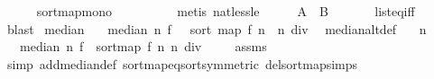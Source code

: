 \begin{isabellebody}
\ \ \ \ \isamarkupfalse%
\ sort{\isacharunderscore}{\kern0pt}map{\isacharunderscore}{\kern0pt}mono\ \ \ \ \isanewline
\ \ \ \ \isamarkupfalse%
\ {\isacharparenleft}{\kern0pt}metis\ nat{\isacharunderscore}{\kern0pt}less{\isacharunderscore}{\kern0pt}le{\isacharparenright}{\kern0pt}\isanewline
\ \ \isamarkupfalse%
\ \isamarkupfalse%
\ {\isachardoublequoteopen}{\isacharquery}{\kern0pt}A\ {\isacharequal}{\kern0pt}\ {\isacharquery}{\kern0pt}B{\isachardoublequoteclose}\ \isanewline
\ \ \ \ \isamarkupfalse%
\ list{\isacharunderscore}{\kern0pt}eq{\isacharunderscore}{\kern0pt}iff\ \isamarkupfalse%
\ blast\isanewline
{}\isamarkupfalse%
%
\endisatagproof
{\isafoldproof}%
%
\isadelimproof
\isanewline
%
\endisadelimproof
\isanewline
{}\isamarkupfalse%
\ median\ \isanewline
\ \ {\isachardoublequoteopen}median\ n\ f\ {\isacharequal}{\kern0pt}\ \ sort\ {\isacharparenleft}{\kern0pt}map\ f\ {\isacharbrackleft}{\kern0pt}{}{\isachardot}{\kern0pt}{\isachardot}{\kern0pt}{\isacharless}{\kern0pt}n{\isacharbrackright}{\kern0pt}{\isacharparenright}{\kern0pt}\ {\isacharbang}{\kern0pt}\ {\isacharparenleft}{\kern0pt}n\ div\ {}{\isacharparenright}{\kern0pt}{\isachardoublequoteclose}\isanewline
\isanewline
{}\isamarkupfalse%
\ median{\isacharunderscore}{\kern0pt}alt{\isacharunderscore}{\kern0pt}def{\isacharcolon}{\kern0pt}\isanewline
\ \ \ {\isachardoublequoteopen}n\ {\isachargreater}{\kern0pt}\ {}{\isachardoublequoteclose}\isanewline
\ \ \ {\isachardoublequoteopen}median\ n\ f\ {\isacharequal}{\kern0pt}\ {\isacharparenleft}{\kern0pt}sort{\isacharunderscore}{\kern0pt}map\ f\ n{\isacharparenright}{\kern0pt}\ {\isacharparenleft}{\kern0pt}n\ div\ {}{\isacharparenright}{\kern0pt}{\isachardoublequoteclose}\isanewline
%
\isadelimproof
\ \ %
\endisadelimproof
%
\isatagproof
{}\isamarkupfalse%
\ assms\isanewline
\ \ \isamarkupfalse%
\ {\isacharparenleft}{\kern0pt}simp\ add{\isacharcolon}{\kern0pt}median{\isacharunderscore}{\kern0pt}def\ sort{\isacharunderscore}{\kern0pt}map{\isacharunderscore}{\kern0pt}eq{\isacharunderscore}{\kern0pt}sort{\isacharbrackleft}{\kern0pt}symmetric{\isacharbrackright}{\kern0pt}\ del{\isacharcolon}{\kern0pt}sort{\isacharunderscore}{\kern0pt}map{\isachardot}{\kern0pt}simps{\isacharparenright}{\kern0pt}%
\endisatagproof
{\isafoldproof}%
%
\isadelimproof
\isanewline
%
\endisadelimproof

\end{isabellebody}
